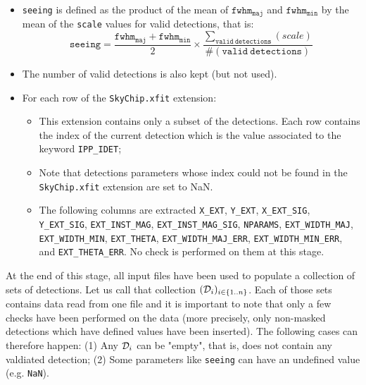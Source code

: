 \documentclass[panstarrs,spec]{panstarrs}
\begin{document}
\begin{itemize}
\begin{itemize}
    \[
    \mathtt{raErr} = \frac{\mathtt{scale}}{3600}
    \sqrt{\cos^2(\mathtt{angle}) \mathtt{xErr}^2 +
      \sin^2(\mathtt{angle}) \mathtt{yErr}^2}
    \]
  \item \texttt{decErr} is defined by: 
    \[
    \mathtt{decErr} = \frac{\mathtt{scale}}{3600}
    \sqrt{\sin^2(\mathtt{angle}) \mathtt{xErr}^2 +
      \cos^2(\mathtt{angle}) \mathtt{yErr}^2}
    \]
  \end{itemize}
\item \texttt{seeing} is defined as the product of the mean of
  $\mathtt{fwhm}_\mathtt{maj}$ and $\mathtt{fwhm}_\mathtt{min}$ by the
  mean of the \texttt{scale} values for valid detections, that is:
  \[
  \mathtt{seeing} = \frac{\mathtt{fwhm}_\mathtt{maj} +
    \mathtt{fwhm}_\mathtt{min}}{2} \times \frac{\sum_{\mathtt{valid\
        detections}}(scale)}{\#(\mathtt{valid\ detections})}
  \]
\item The number of valid detections is also kept (but not used).
\item For each row of the \texttt{SkyChip.xfit} extension:
  \begin{itemize}
  \item This extension contains only a subset of the detections. Each
    row contains the index of the current detection which is the value
    associated to the keyword \texttt{IPP\_IDET};
  \item Note that detections parameters whose index could not be found
    in the \texttt{SkyChip.xfit} extension are set to NaN.
  \item The following columns are extracted \texttt{X\_EXT},
    \texttt{Y\_EXT}, \texttt{X\_EXT\_SIG}, \texttt{Y\_EXT\_SIG},
    \texttt{EXT\_INST\_MAG}, \texttt{EXT\_INST\_MAG\_SIG},
    \texttt{NPARAMS}, \texttt{EXT\_WIDTH\_MAJ}, \texttt{EXT\_WIDTH\_MIN},
    \texttt{EXT\_THETA}, \texttt{EXT\_WIDTH\_MAJ\_ERR},
    \texttt{EXT\_WIDTH\_MIN\_ERR}, and \texttt{EXT\_THETA\_ERR}. No check is
    performed on them at this stage.
  \end{itemize}
\end{itemize}

At the end of this stage, all input files have been used to populate a
collection of sets of detections. Let us call that collection $({\cal
  D}_{i})_{i \in \{1..n\}}$. Each of those sets contains data read
from one file and it is important to note that only a few checks have
been performed on the data (more precisely, only non-masked detections
which have defined values have been inserted). The following cases can
therefore happen: (1) Any ${\cal D}_i$ can be "empty", that is, does
not contain any valdiated detection; (2) Some parameters like
\texttt{seeing} can have an undefined value (e.g. \texttt{NaN}).
\end{document}
